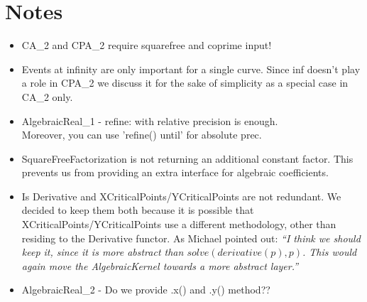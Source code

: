 \section{Notes}
\begin{itemize}
 \item CA\_2 and CPA\_2 require squarefree and coprime input! 
 \item Events at infinity are only important for a single curve. Since
   inf doesn't play a role in CPA\_2 we discuss it for the sake of
   simplicity as a special case in CA\_2 only. 
\item AlgebraicReal\_1 - refine: with relative precision is enough. \\
      Moreover, you can use 'refine() until' for absolute prec.
\item SquareFreeFactorization is not returning an additional constant 
      factor. This prevents us from providing an extra interface for 
      algebraic coefficients.
 \item Is Derivative and XCriticalPoints/YCriticalPoints are not
   redundant. We decided to keep them both because it is possible that
   XCriticalPoints/YCriticalPoints use a different methodology, other
   than residing to the Derivative functor. As Michael pointed out:
   \emph{``I think we should keep it, since it is more abstract than
     $solve(derivative(p),p)$.  This would again move the {\em
       AlgebraicKernel} towards a more abstract layer.''}
 \item AlgebraicReal\_2 - Do we provide .x() and .y() method??\\\end{itemize}

